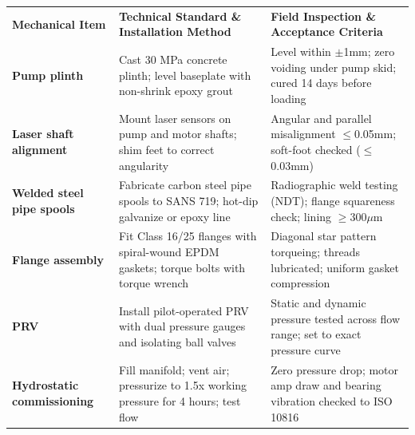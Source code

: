 \documentclass[a4paper,11pt]{article}
\begin{document}
{\fontsize{7.7pt}{9.8pt}\selectfont
\renewcommand{\arraystretch}{1.23}
\noindent
\begin{tabularx}{\textwidth}{@{}p{3.3cm} p{6.6cm} X@{}}
\rowcolor{mhnavy}
{\color{white}\bfseries Mechanical Item} & {\color{white}\bfseries Technical Standard \& Installation Method} & {\color{white}\bfseries Field Inspection \& Acceptance Criteria} \\
\rowcolor{mhbluelight}
\bfseries Pump plinth & Cast 30 MPa concrete plinth; level baseplate with non-shrink epoxy grout & Level within $\pm$1mm; zero voiding under pump skid; cured 14 days before loading \\
\bfseries Laser shaft alignment & Mount laser sensors on pump and motor shafts; shim feet to correct angularity & Angular and parallel misalignment $\le$0.05mm; soft-foot checked ($\le$0.03mm) \\
\rowcolor{mhbluelight}
\bfseries Welded steel pipe spools & Fabricate carbon steel pipe spools to SANS 719; hot-dip galvanize or epoxy line & Radiographic weld testing (NDT); flange squareness check; lining $\ge$300$\mu$m \\
\bfseries Flange assembly & Fit Class 16/25 flanges with spiral-wound EPDM gaskets; torque bolts with torque wrench & Diagonal star pattern torqueing; threads lubricated; uniform gasket compression \\
\rowcolor{mhbluelight}
\bfseries PRV & Install pilot-operated PRV with dual pressure gauges and isolating ball valves & Static and dynamic pressure tested across flow range; set to exact pressure curve \\
\bfseries Hydrostatic commissioning & Fill manifold; vent air; pressurize to 1.5x working pressure for 4 hours; test flow & Zero pressure drop; motor amp draw and bearing vibration checked to ISO 10816 \\
\end{tabularx}
\renewcommand{\arraystretch}{1}
}

\vfill
\end{document}
